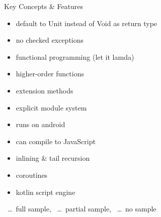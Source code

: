 \begin{frame}{Key Concepts \& Features}
	\begin{itemize}
		\item default to Unit instead of Void as return type \xmark 
		\item no checked exceptions \xmark
		\item functional programming (let it lamda) \tmark
		\item higher-order functions \tmark
		\item extension methods \cmark
		\item explicit module system \xmark
		\item runs on android \xmark
		\item can compile to JavaScript \xmark
		\item inlining \& tail recursion \xmark
		\item coroutines \tmark
		\item kotlin script engine \xmark 
	\end{itemize}
\cmark\ \dots\ full sample, \tmark\ \dots\ partial sample, \xmark\ \dots\ no sample
\end{frame}

